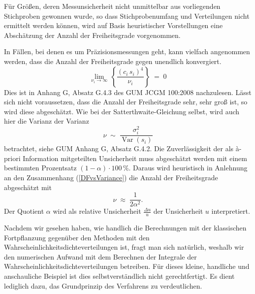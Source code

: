 Für Größen, deren Messunsicherheit nicht unmittelbar aus vorliegenden
Stichproben gewonnen wurde, so dass Stichprobenumfang und Verteilungen nicht ermittelt
werden können, wird auf Basis heuristischer Vorstellungen eine Abschätzung der Anzahl der Freiheitsgrade
vorgenommen.

In Fällen, bei denen es um Präzisionsmessungen geht, kann vielfach angenommen werden,
dass die Anzahl der Freiheitsgrade gegen unendlich konvergiert.
\begin{equation}
\lim\limits_{\nu_i \rightarrow \infty} \, \left\{ \frac{ (c_i \, s_i)^4}{\nu_i} \right\} \; = \; 0
\end{equation}
Dies ist in Anhang G, Absatz G.4.3 des GUM JCGM 100:2008 nachzulesen. Lässt sich nicht
voraussetzen, dass die Anzahl der Freiheitsgrade sehr, sehr groß ist, so wird diese
abgeschätzt. Wie bei der Satterthwaite-Gleichung selbst, wird auch hier die Varianz der Varianz
\begin{equation}
\nu \; \sim \; \frac{\sigma_i^2}{\operatorname{Var}(s_i)}
\label{DFvsVariance}
\end{equation}
betrachtet, siehe GUM Anhang G, Absatz G.4.2.
Die Zuverlässigkeit der als {\`a}-priori Information mitgeteilten Unsicherheit muss
abgeschätzt werden mit einem bestimmten Prozentsatz
$(1 - \alpha) \cdot 100 \, \%$. Daraus wird heuristisch in Anlehnung an den
Zusammenhang (\ref{DFvsVariance}) die Anzahl der Freiheitsgrade abgeschätzt mit
\begin{equation}
\nu \; \approx \; \frac{1}{2 \alpha^2} .
\end{equation}
Der Quotient $\alpha$ wird als relative Unsicherheit $\frac{\Delta u}{u}$ der Unsicherheit $u$
interpretiert.

Nachdem wir gesehen haben, wie handlich die Berechnungen mit der klassischen Fortpflanzung
gegenüber den Methoden mit den Wahrscheinlichkeitsdichteverteilungen ist,
fragt man sich natürlich, weshalb wir den numerischen Aufwand mit dem Berechnen der
Integrale der Wahrscheinlichkeitsdichteverteilungen betreiben.
Für dieses kleine, handliche und anschauliche Beispiel ist dies selbstverständlich nicht
gerechtfertigt. Es dient lediglich dazu, das Grundprinzip des Verfahrens zu verdeutlichen.

